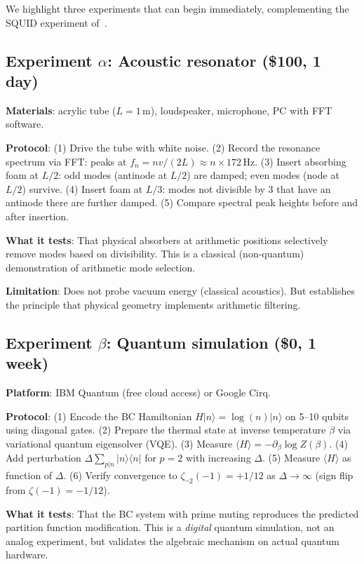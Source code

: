 \documentclass[11pt,a4paper]{article}
\begin{document}
We highlight three experiments that can begin immediately,
complementing the SQUID experiment of~\cite{paper_A}.

\subsection{Experiment $\alpha$: Acoustic resonator (\$100, 1 day)}

\textbf{Materials}: acrylic tube ($L = 1$\,m), loudspeaker, microphone, PC with FFT software.

\textbf{Protocol}:
(1) Drive the tube with white noise.
(2) Record the resonance spectrum via FFT: peaks at
$f_n = nv/(2L) \approx n \times 172$\,Hz.
(3) Insert absorbing foam at $L/2$: odd modes (antinode at $L/2$)
are damped; even modes (node at $L/2$) survive.
(4) Insert foam at $L/3$: modes not divisible by 3 that have
an antinode there are further damped.
(5) Compare spectral peak heights before and after insertion.

\textbf{What it tests}: That physical absorbers at arithmetic
positions selectively remove modes based on divisibility.
This is a classical (non-quantum) demonstration of
arithmetic mode selection.

\textbf{Limitation}: Does not probe vacuum energy
(classical acoustics). But establishes the principle that
physical geometry implements arithmetic filtering.

\subsection{Experiment $\beta$: Quantum simulation (\$0, 1 week)}

\textbf{Platform}: IBM Quantum (free cloud access) or Google Cirq.

\textbf{Protocol}:
(1) Encode the BC Hamiltonian $H|n\rangle = \log(n)|n\rangle$
on 5--10 qubits using diagonal gates.
(2) Prepare the thermal state at inverse temperature $\beta$
via variational quantum eigensolver (VQE).
(3) Measure $\langle H \rangle = -\partial_\beta \log Z(\beta)$.
(4) Add perturbation $\Delta \sum_{p|n} |n\rangle\langle n|$
for $p = 2$ with increasing $\Delta$.
(5) Measure $\langle H \rangle$ as function of $\Delta$.
(6) Verify convergence to $\zeta_{\neg 2}(-1) = +1/12$ as
$\Delta \to \infty$ (sign flip from $\zeta(-1) = -1/12$).

\textbf{What it tests}: That the BC system with prime muting
reproduces the predicted partition function modification.
This is a \emph{digital} quantum simulation, not an analog
experiment, but validates the algebraic mechanism on
actual quantum hardware.
\end{document}
